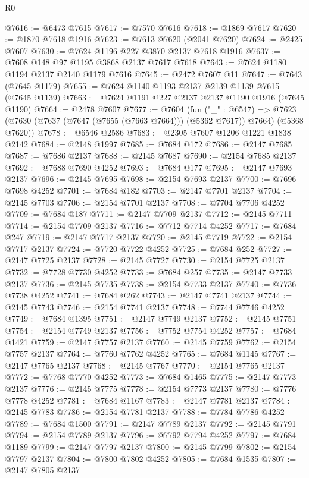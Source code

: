 \begin{lexlean}{R0}
\begin{coremodule}
@7616 := @6473 @7615
@7617 := @7570 @7616
@7618 := @1869 @7617
@7620 := @1870 @7618 @1916
@7623 := @7613 @7620 (@2041 @7620)
@7624 := @2425 @7607
@7630 := @7624 @1196 @227 @3870 @2137 @7618 @1916
@7637 := @7608 @148 @97 @1195 @3868 @2137 @7617 @7618
@7643 := @7624 @1180 @1194 @2137 @2140 @1179 @7616
@7645 := @2472 @7607 @11
@7647 := @7643 (@7645 @1179)
@7655 := @7624 @1140 @1193 @2137 @2139 @1139 @7615 (@7645 @1139)
@7663 := @7624 @1191 @227 @2137 @2137 @1190 @1916 (@7645 @1190)
@7664 := @2478 @7607
@7677 := @7604
    (fun ("_" : @6547) =>
    @7623 (@7630 (@7637 (@7647 (@7655 (@7663 @7664))) (@5362 @7617)) @7664) (@5368 @7620))
@7678 := @6546 @2586
@7683 := @2305 @7607 @1206 @1221 @1838 @2142
@7684 := @2148 @1997
@7685 := @7684 @172
@7686 := @2147 @7685
@7687 := @7686 @2137
@7688 := @2145 @7687
@7690 := @2154 @7685 @2137
@7692 := @7688 @7690 @4252
@7693 := @7684 @177
@7695 := @2147 @7693 @2137
@7696 := @2145 @7695
@7698 := @2154 @7693 @2137
@7700 := @7696 @7698 @4252
@7701 := @7684 @182
@7703 := @2147 @7701 @2137
@7704 := @2145 @7703
@7706 := @2154 @7701 @2137
@7708 := @7704 @7706 @4252
@7709 := @7684 @187
@7711 := @2147 @7709 @2137
@7712 := @2145 @7711
@7714 := @2154 @7709 @2137
@7716 := @7712 @7714 @4252
@7717 := @7684 @247
@7719 := @2147 @7717 @2137
@7720 := @2145 @7719
@7722 := @2154 @7717 @2137
@7724 := @7720 @7722 @4252
@7725 := @7684 @252
@7727 := @2147 @7725 @2137
@7728 := @2145 @7727
@7730 := @2154 @7725 @2137
@7732 := @7728 @7730 @4252
@7733 := @7684 @257
@7735 := @2147 @7733 @2137
@7736 := @2145 @7735
@7738 := @2154 @7733 @2137
@7740 := @7736 @7738 @4252
@7741 := @7684 @262
@7743 := @2147 @7741 @2137
@7744 := @2145 @7743
@7746 := @2154 @7741 @2137
@7748 := @7744 @7746 @4252
@7749 := @7684 @1395
@7751 := @2147 @7749 @2137
@7752 := @2145 @7751
@7754 := @2154 @7749 @2137
@7756 := @7752 @7754 @4252
@7757 := @7684 @1421
@7759 := @2147 @7757 @2137
@7760 := @2145 @7759
@7762 := @2154 @7757 @2137
@7764 := @7760 @7762 @4252
@7765 := @7684 @1145
@7767 := @2147 @7765 @2137
@7768 := @2145 @7767
@7770 := @2154 @7765 @2137
@7772 := @7768 @7770 @4252
@7773 := @7684 @1465
@7775 := @2147 @7773 @2137
@7776 := @2145 @7775
@7778 := @2154 @7773 @2137
@7780 := @7776 @7778 @4252
@7781 := @7684 @1167
@7783 := @2147 @7781 @2137
@7784 := @2145 @7783
@7786 := @2154 @7781 @2137
@7788 := @7784 @7786 @4252
@7789 := @7684 @1500
@7791 := @2147 @7789 @2137
@7792 := @2145 @7791
@7794 := @2154 @7789 @2137
@7796 := @7792 @7794 @4252
@7797 := @7684 @1189
@7799 := @2147 @7797 @2137
@7800 := @2145 @7799
@7802 := @2154 @7797 @2137
@7804 := @7800 @7802 @4252
@7805 := @7684 @1535
@7807 := @2147 @7805 @2137

\end{coremodule}
\end{lexlean}

